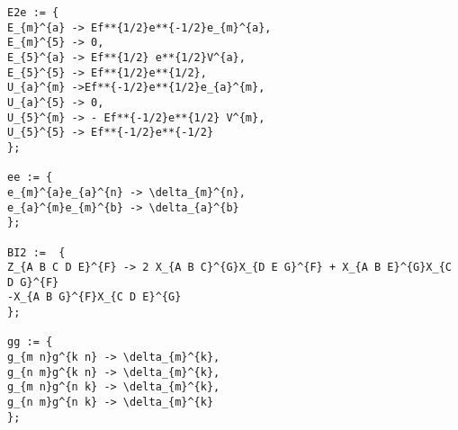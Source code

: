 \documentclass[11pt]{article}
\begin{document}
{\begin{verbatim}
E2e := {
E_{m}^{a} -> Ef**{1/2}e**{-1/2}e_{m}^{a},
E_{m}^{5} -> 0,
E_{5}^{a} -> Ef**{1/2} e**{1/2}V^{a},
E_{5}^{5} -> Ef**{1/2}e**{1/2},
U_{a}^{m} ->Ef**{-1/2}e**{1/2}e_{a}^{m},
U_{a}^{5} -> 0,
U_{5}^{m} -> - Ef**{-1/2}e**{1/2} V^{m},
U_{5}^{5} -> Ef**{-1/2}e**{-1/2}
};

ee := {
e_{m}^{a}e_{a}^{n} -> \delta_{m}^{n},
e_{a}^{m}e_{m}^{b} -> \delta_{a}^{b}
};

BI2 :=  {
Z_{A B C D E}^{F} -> 2 X_{A B C}^{G}X_{D E G}^{F} + X_{A B E}^{G}X_{C D G}^{F}
-X_{A B G}^{F}X_{C D E}^{G}
};

gg := {
g_{m n}g^{k n} -> \delta_{m}^{k},
g_{n m}g^{k n} -> \delta_{m}^{k},
g_{m n}g^{n k} -> \delta_{m}^{k},
g_{n m}g^{n k} -> \delta_{m}^{k}
};
\end{verbatim}}
\end{document}
